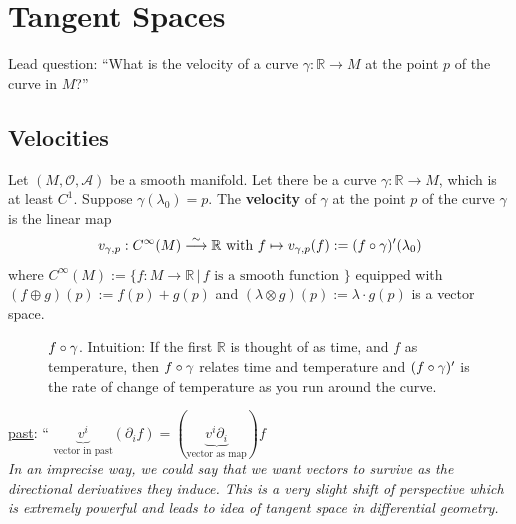 \section{Tangent Spaces}
Lead question: ``What is the velocity of a curve $\gamma : \mathbb{R} \to M$ at the point $p$ of the curve in $M$?''

\subsection{Velocities}
\begin{definition} Let $(M,\mathcal{O},\mathcal{A})$ be a smooth manifold. Let there be a curve $\gamma : \mathbb{R} \to M$, which is at least $C^1$. Suppose $\gamma(\lambda_0) =p$. The \textbf{velocity} of $\gamma$ at the point $p$ of the curve $\gamma$ is the linear map \\
\begin{equation}\label{eq_velocity}
v_{\gamma, p} : C^{\infty}(M) \stackrel{\sim}{\longrightarrow} \mathbb{R} \text{ with }
f \mapsto v_{\gamma,p}(f):= (f \circ \gamma)^{\prime}(\lambda_0)
\end{equation}
where $C^{\infty}(M) := \lbrace f: M \to \mathbb{R} \, | \, f \text{ is a smooth function } \rbrace$ equipped with \\
$(f \oplus g)(p) := f(p) + g(p)$ and $(\lambda \otimes g)(p) := \lambda \cdot g(p)$ is a vector space.
\end{definition}

\begin{figure}
\label{fig:L5_fAfterGamma}
  \centering
    \caption{$f \circ \gamma$. Intuition: If the first $\mathbb{R}$ is thought of as time, and $f$ as temperature, then $f \circ \gamma$ relates time and temperature and $(f \circ \gamma)^\prime$ is the rate of change of temperature as you run around the curve.}
\end{figure}

\underline{past}: `` $\underbrace{v^i}_{\text{vector in past}} (\partial_i f) = (\underbrace{v^i \partial_i}_{\text{vector as map}})f$ \\
\textit{In an imprecise way, we could say that we want vectors to survive as the directional derivatives they induce. This is a very slight shift of perspective which is extremely powerful and leads to idea of tangent space in differential geometry.}

